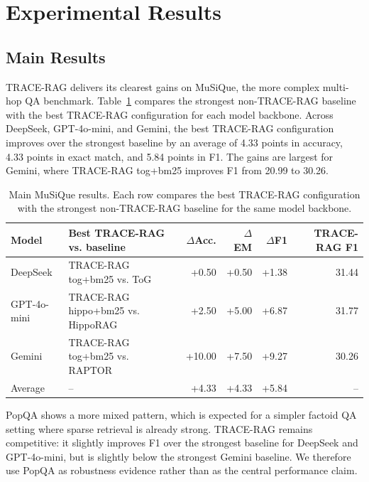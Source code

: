 ﻿%
%

\section{Experimental Results}
\label{sec:results}

\subsection{Main Results}
\label{sec:main-results}

TRACE-RAG delivers its clearest gains on MuSiQue, the more complex multi-hop QA
benchmark. Table~\ref{tab:musique-main-results} compares the strongest
non-TRACE-RAG baseline with the best TRACE-RAG configuration for each model backbone.
Across DeepSeek, GPT-4o-mini, and Gemini, the best TRACE-RAG configuration improves
over the strongest baseline by an average of 4.33 points in accuracy, 4.33
points in exact match, and 5.84 points in F1. The gains are largest for Gemini,
where TRACE-RAG tog+bm25 improves F1 from 20.99 to 30.26.

\begin{table}[t]
\centering
\small
\begin{tabular}{llrrrr}
\toprule
Model & Best TRACE-RAG vs. baseline & $\Delta$Acc. & $\Delta$EM & $\Delta$F1 & TRACE-RAG F1 \\
\midrule
DeepSeek & TRACE-RAG tog+bm25 vs. ToG & +0.50 & +0.50 & +1.38 & 31.44 \\
GPT-4o-mini & TRACE-RAG hippo+bm25 vs. HippoRAG & +2.50 & +5.00 & +6.87 & 31.77 \\
Gemini & TRACE-RAG tog+bm25 vs. RAPTOR & +10.00 & +7.50 & +9.27 & 30.26 \\
\midrule
Average & -- & +4.33 & +4.33 & +5.84 & -- \\
\bottomrule
\end{tabular}
\caption{Main MuSiQue results. Each row compares the best TRACE-RAG configuration
with the strongest non-TRACE-RAG baseline for the same model backbone.}
\label{tab:musique-main-results}
\end{table}

PopQA shows a more mixed pattern, which is expected for a simpler factoid QA
setting where sparse retrieval is already strong. TRACE-RAG remains competitive:
it slightly improves F1 over the strongest baseline for DeepSeek and
GPT-4o-mini, but is slightly below the strongest Gemini baseline. We therefore
use PopQA as robustness evidence rather than as the central performance claim.

